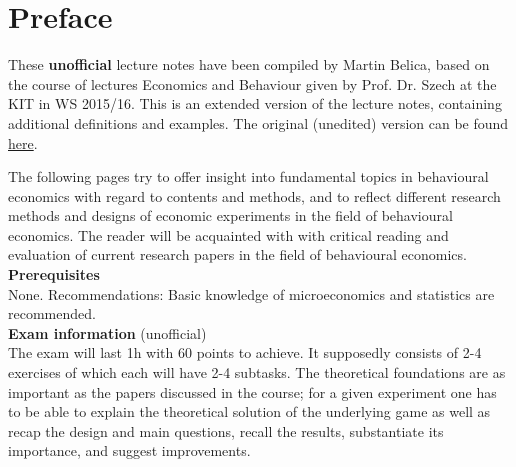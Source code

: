 

\chapter*{Preface}

These \textbf{unofficial} lecture notes have been compiled by Martin Belica, based on the course of lectures Economics and Behaviour given by Prof. Dr. Szech at the KIT in WS 2015/16. This is an extended version of the lecture notes, containing additional definitions and examples. The original (unedited) version can be found \href{http://goo.gl/EOC2Kh}{here}.

The following pages try to offer insight into fundamental topics in behavioural economics with regard to contents and methods, and to reflect different research methods and designs of economic experiments in the field of behavioural economics. The reader will be acquainted with with critical reading and evaluation of current research papers in the field of behavioural economics. \\

\textbf{Prerequisites} \\
None. Recommendations: Basic knowledge of microeconomics and statistics are recommended. \\

\textbf{Exam information} (unofficial)  \\
The exam will last 1h with 60 points to achieve. It supposedly consists of 2-4 exercises of which each will have 2-4 subtasks. The theoretical foundations are as important as the papers discussed in the course; for a given experiment one has to be able to explain the theoretical solution of the underlying game as well as recap the design and main questions, recall the results, substantiate its importance, and suggest improvements.